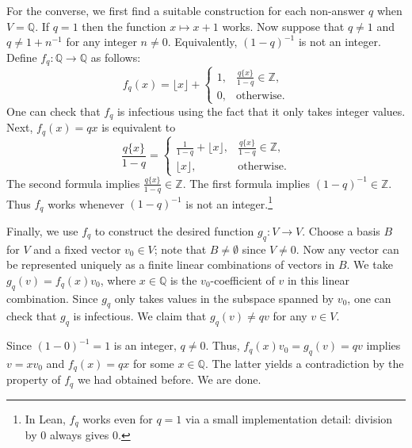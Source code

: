 \documentclass{article}
\newcommand{\Q}{\mathbb{Q}}
\newcommand{\Z}{\mathbb{Z}}
\begin{document}
For the converse, we first find a suitable construction for each non-answer $q$ when $V = \Q$.
If $q = 1$ then the function $x \mapsto x + 1$ works.
Now suppose that $q \neq 1$ and $q \neq 1 + n^{-1}$ for any integer $n \neq 0$.
Equivalently, $(1 - q)^{-1}$ is not an integer.
Define $f_q : \Q \to \Q$ as follows:
\[ f_q(x) = \lfloor x \rfloor + \begin{cases} 1, & \frac{q \{x\}}{1 - q} \in \Z, \\ 0, & \text{otherwise.} \end{cases} \]
One can check that $f_q$ is infectious using the fact that it only takes integer values.
Next, $f_q(x) = qx$ is equivalent to
\[ \frac{q \{x\}}{1 - q} = \begin{cases} \frac{1}{1 - q} + \lfloor x \rfloor, & \frac{q \{x\}}{1 - q} \in \Z, \\ \lfloor x \rfloor, & \text{otherwise.} \end{cases} \]
The second formula implies $\frac{q \{x\}}{1 - q} \in \Z$.
The first formula implies $(1 - q)^{-1} \in \Z$.
Thus $f_q$ works whenever $(1 - q)^{-1}$ is not an integer.\footnote{
    In Lean, $f_q$ works even for $q = 1$ via a small implementation detail: division by $0$ always gives $0$.}

Finally, we use $f_q$ to construct the desired function $g_q : V \to V$.
Choose a basis $B$ for $V$ and a fixed vector $v_0 \in V$; note that $B \neq \emptyset$ since $V \neq 0$.
Now any vector can be represented uniquely as a finite linear combinations of vectors in $B$.
We take $g_q(v) = f_q(x) v_0$, where $x \in \Q$ is the $v_0$-coefficient of $v$ in this linear combination.
Since $g_q$ only takes values in the subspace spanned by $v_0$, one can check that $g_q$ is infectious.
We claim that $g_q(v) \neq qv$ for any $v \in V$.

Since $(1 - 0)^{-1} = 1$ is an integer, $q \neq 0$.
Thus, $f_q(x) v_0 = g_q(v) = qv$ implies $v = x v_0$ and $f_q(x) = qx$ for some $x \in \Q$.
The latter yields a contradiction by the property of $f_q$ we had obtained before.
We are done.
\end{document}
